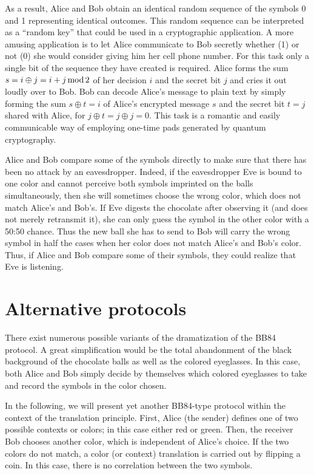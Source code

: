 \documentclass[prb,amssymb,preprint]{revtex4}
\begin{document}
As a result, Alice and Bob obtain an identical random sequence of the
symbols 0 and 1 representing identical outcomes.
This random
sequence can be interpreted as a ``random key'' that could be used in a
cryptographic application. A more amusing application is to let Alice
communicate to Bob secretly whether (1) or not (0) she would consider giving
him her cell phone number. For this task only a single bit of the
sequence they have created is required. Alice forms the sum $s= i\oplus j= i+j
\,{\rm mod}\, 2$ of her decision $i$ and the secret bit $j$ and cries it out loudly
over to Bob. Bob can decode Alice's message to plain text by simply forming
the sum $s\oplus t=i$ of Alice's encrypted message $s$ and the secret bit
$t=j$ shared with Alice, for $j\oplus t=j\oplus j=0$. This task is a
romantic and easily communicable way of employing one-time pads generated by
quantum cryptography.

Alice and Bob compare some of the symbols directly to make sure that
there has been no attack by an eavesdropper. Indeed, if the eavesdropper Eve
is bound to one color and cannot perceive both symbols imprinted on the balls
simultaneously, then she will sometimes choose the wrong color, which does
not match Alice's and Bob's. If Eve digests the chocolate after observing
it (and does not merely retransmit it), she can only guess the symbol in the
other color with a 50:50 chance. Thus the new ball she has to send to Bob
will carry the wrong symbol in half the cases when her color does not
match Alice's and Bob's color. Thus, if Alice and Bob compare some of their
symbols, they could realize that Eve is listening.

\section{Alternative protocols}

There exist numerous possible variants of the dramatization of the BB84
protocol. A great simplification would be the total abandonment of the black
background of the chocolate balls as well as the colored eyeglasses. In
this case, both Alice and Bob simply decide by themselves which colored
eyeglasses to take and record the symbols in the color chosen.

In the following, we will present yet another BB84-type protocol
within the context of the translation principle.\cite{svozil-2003-garda}
First, Alice (the sender) defines one of two possible contexts or
colors; in this case either red or green.
Then, the receiver Bob chooses another color, which is independent of Alice's
choice. If the two colors do not match, a color (or context\cite{svozil-2003-garda})
translation
is carried out by flipping a coin. In this case, there is
no correlation between the two symbols.
\end{document}
